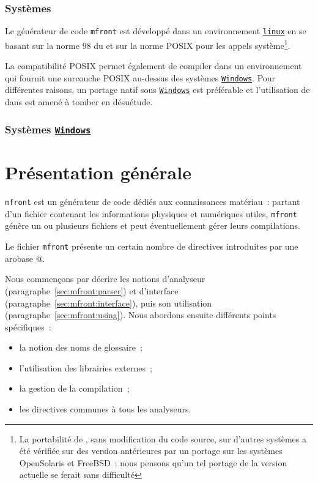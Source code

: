 \documentclass[rectoverso,pleiades,pstricks,leqno,anti]{texmf/note_technique_2010}
\newcommand{\mfront}{\texttt{mfront}}
\newcommand{\tfel}[1]{\index{tfel}{#1}{\texttt{#1}}}
\def\ifmonospace{\ifdim\fontdimen3\font=0pt }
\def\cpp{%
\ifmonospace%
    C++%
\else%
    C\kern-.1667em\raise.30ex\hbox{\smaller{++}}%
\fi%
\spacefactor1000 }
\newcommand{\windows}{\href{http://www.microsoft.com/france/windows/default.mspx}{\texttt{Windows}}}
\newcommand{\linux}{\href{http://www.kernel.org/}{\texttt{linux}}}
\begin{document}
\subsubsection{Systèmes \unix{}}

Le générateur de code \mfront{} est développé dans un environnement
\linux{} en se basant sur la norme \(98\) du \cpp{} et sur la norme
POSIX pour les appels système\footnote{La portabilité de \tfel{}, sans
  modification du code source, sur d'autres systèmes \unix{} a été
  vérifiée sur des version antérieures par un portage sur les systèmes
  OpenSolaris et FreeBSD~: nous pensons qu'un tel portage de la
  version actuelle se ferait sans difficulté}.

La compatibilité POSIX permet également de compiler \tfel{} dans un
environnement \cygwin{} qui fournit une surcouche POSIX au-dessus des
systèmes \windows{}. Pour différentes raisons, un portage natif sous
\windows{} est préférable et l'utilisation de \tfel{} dans \cygwin{}
est amené à tomber en désuétude.

\subsubsection{Systèmes \windows{}}



\clearpage
\newpage
\section{Présentation générale}

\mfront{} est un générateur de code dédiés aux connaissances matériau~:
partant d'un fichier contenant les informations physiques et numériques
utiles, \mfront{} génère un ou plusieurs fichiers \cpp{} et peut
éventuellement gérer leurs compilations.

Le fichier \mfront{} présente un certain nombre de directives
introduites par une arobase @.

Nous commençons par décrire les notions d'analyseur
(paragraphe~\ref{sec:mfront:parser}) et d'interface
(paragraphe~\ref{sec:mfront:interface}), puis son utilisation
(paragraphe~\ref{sec:mfront:using}). Nous abordons ensuite différents
points spécifiques~:
\begin{itemize}
  \item la notion des noms de glossaire~;
  \item l'utilisation des librairies externes~;
  \item la gestion de la compilation~;
  \item les directives communes à tous les analyseurs.
\end{itemize}
\end{document}
